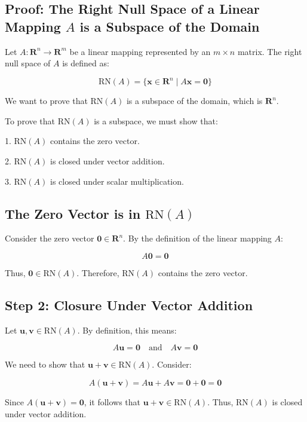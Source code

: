 \documentclass{article}
\begin{document}
\subsection{Proof: The Right Null Space of a Linear Mapping \( A \) is a Subspace of the Domain}

Let \( A: \mathbf{R}^n \to \mathbf{R}^m \) be a linear mapping represented by an \( m \times n \) matrix. The right null space of \( A \) is defined as:

\[
\text{RN}(A) = \{ \mathbf{x} \in \mathbf{R}^n \mid A \mathbf{x} = \mathbf{0} \}
\]

We want to prove that \( \text{RN}(A) \) is a subspace of the domain, which is \( \mathbf{R}^n \).

To prove that \( \text{RN}(A) \) is a subspace, we must show that:

1. \( \text{RN}(A) \) contains the zero vector.

2. \( \text{RN}(A) \) is closed under vector addition.

3. \( \text{RN}(A) \) is closed under scalar multiplication.

\subsection{The Zero Vector is in \( \text{RN}(A) \)}

Consider the zero vector \( \mathbf{0} \in \mathbf{R}^n \). By the definition of the linear mapping \( A \):

\[
A \mathbf{0} = \mathbf{0}
\]

Thus, \( \mathbf{0} \in \text{RN}(A) \). Therefore, \( \text{RN}(A) \) contains the zero vector.

\subsection{Step 2: Closure Under Vector Addition}

Let \( \mathbf{u}, \mathbf{v} \in \text{RN}(A) \). By definition, this means:

\[
A \mathbf{u} = \mathbf{0} \quad \text{and} \quad A \mathbf{v} = \mathbf{0}
\]

We need to show that \( \mathbf{u} + \mathbf{v} \in \text{RN}(A) \). Consider:

\[
A(\mathbf{u} + \mathbf{v}) = A\mathbf{u} + A\mathbf{v} = \mathbf{0} + \mathbf{0} = \mathbf{0}
\]

Since \( A(\mathbf{u} + \mathbf{v}) = \mathbf{0} \), it follows that \( \mathbf{u} + \mathbf{v} \in \text{RN}(A) \). Thus, \( \text{RN}(A) \) is closed under vector addition.
\end{document}
